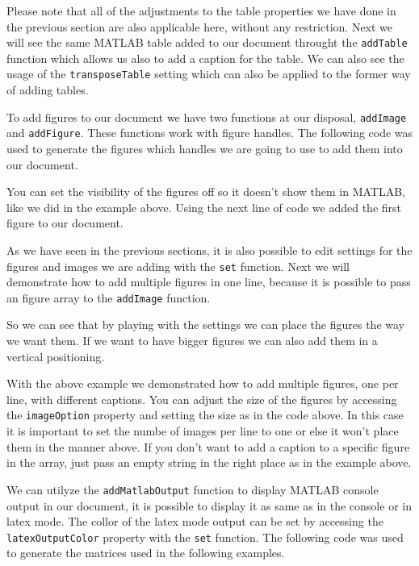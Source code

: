 
Please note that all of the adjustments to the table properties we have done in the previous section are also applicable 
here, without any restriction. Next we will see the same MATLAB table added to our document throught the {\tt addTable} 
function which allows us also to add a caption for the table. We can also see the usage of the {\tt transposeTable} setting
which can also be applied to the former way of adding tables.


To add figures to our document we have two functions at our disposal, {\tt addImage} and {\tt addFigure}. These functions work
with figure handles. The following code was used to generate the figures which handles we are going to use to add them into 
our document.


You can set the visibility of the figures off so it doesn't show them in MATLAB, like we did in the example above. Using the 
next line of code we added the first figure to our document.


As we have seen in the previous sections, it is also possible to edit settings for the figures and images we are adding with
the {\tt set} function. Next we will demonstrate how to add multiple figures in one line, because it is possible to pass an 
figure array to the {\tt addImage} function.


So we can see that by playing with the settings we can place the figures the way we want them. If we want to have bigger 
figures we can also add them in a vertical positioning.


With the above example we demonstrated how to add multiple figures, one per line, with different captions. You can adjust
the size of the figures by accessing the {\tt imageOption} property and setting the size as in the code above. In this case it
is important to set the numbe of images per line to one or else it won't place them in the manner above. If you don't want 
to add a caption to a specific figure in the array, just pass an empty string in the right place as in the example above.


We can utilyze the {\tt addMatlabOutput} function to display MATLAB console output in our document, it is possible to display
it as same as in the console or in latex mode. The collor of the latex mode output can be set by accessing the {\tt latexOutputColor}
property with the {\tt set} function. The following code was used to generate the matrices used in the following examples.

